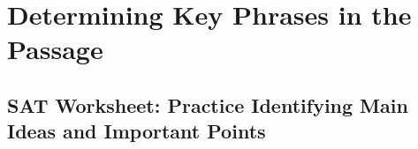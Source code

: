 \section{Determining Key Phrases in the Passage}
\subsection{SAT Worksheet: Practice Identifying Main Ideas and Important Points}